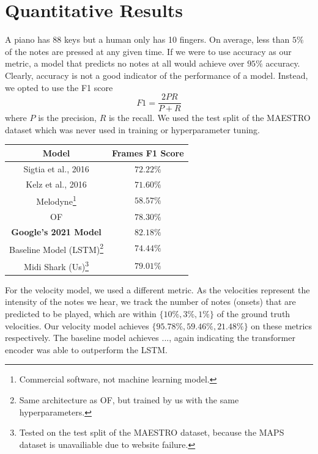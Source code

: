 \documentclass[a4paper,twocolumn,10pt]{article}
\makeatletter
\newcommand\footnoteref[1]{\protected@xdef\@thefnmark{\ref{#1}}\@footnotemark}
\makeatother
\begin{document}
\section{Quantitative Results}

A piano has 88 keys but a human only has 10 fingers. On average, less than $5\%$ of the notes are pressed at any given time. If we were to use accuracy as our metric, a model that predicts no notes at all would achieve over $95\%$ accuracy. Clearly, accuracy is not a good indicator of the performance of a model. Instead, we opted to use the F1 score
\begin{equation}
  F1 = \frac{2PR}{P+R}
\end{equation}
where $P$ is the precision, $R$ is the recall. We used the test split of the MAESTRO dataset which was never used in training or hyperparameter tuning.

\begin{table}[H]
  \begin{minipage}{\linewidth}
    \centering
    \begin{tabular}{|c|c|}
        \hline
        Model& Frames F1 Score \\
        \hline
        Sigtia et al., 2016 & \(72.22\%\)\\
        \hline
        Kelz et al., 2016 & \(71.60\%\)\\
        \hline
        Melodyne\footnote{Commercial software, not machine learning model.} & \(58.57\%\)\\
        \hline
        OF & \(78.30\%\)\\
        \hline
        \textbf{Google’s 2021 Model} & \(\mathbf{82.18\%}\)\\
        \hline
        Baseline Model (LSTM)\footnote{Same architecture as OF, but trained by us with the same hyperparameters.}\footnoteref{fn:midishark} & \(74.44\%\)\\
        \hline
        Midi Shark (Us)\footnote{\label{fn:midishark}Tested on the test split of the MAESTRO dataset, because the MAPS dataset is unavailiable due to website failure.} & \(79.01\%\)\\
        \hline
    \end{tabular}
  \end{minipage}
\end{table}

For the velocity model, we used a different metric. As the velocities represent the intensity of the notes we hear, we track the number of notes (onsets) that are predicted to be played, which are within \(\{10\%, 3\%, 1\%\}\) of the ground truth velocities. Our velocity model achieves \(\{95.78\%, 59.46\%, 21.48\%\}\) on these metrics respectively. The baseline model achieves ..., again indicating the transformer encoder was able to outperform the LSTM.
\end{document}
